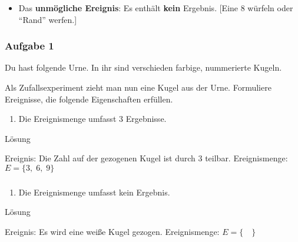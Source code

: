 \documentclass[
  ngerman,
]{book}
\providecommand{\tightlist}{%
  \setlength{\itemsep}{0pt}\setlength{\parskip}{0pt}}
\begin{document}
\begin{itemize}
\tightlist
\item
  Das \textbf{unmögliche Ereignis}: Es enthält \textbf{kein} Ergebnis. {[}Eine 8 würfeln oder ``Rand'' werfen.{]}
\end{itemize}

\hypertarget{section-50}{%
\subsubsection*{}\label{section-50}}

\hypertarget{aufgabe-1-7}{%
\subsubsection*{Aufgabe 1}\label{aufgabe-1-7}}

Du hast folgende Urne. In ihr sind verschieden farbige, nummerierte Kugeln.

Als Zufallsexperiment zieht man nun eine Kugel aus der Urne. Formuliere Ereignisse, die folgende Eigenschaften erfüllen.

\begin{enumerate}
\def\labelenumi{\alph{enumi})}
\tightlist
\item
  Die Ereignismenge umfasst 3 Ergebnisse.
\end{enumerate}

Lösung

Ereignis: Die Zahl auf der gezogenen Kugel ist durch 3 teilbar. Ereignismenge: \(E=\{3,\;6,\;9\}\)

\hypertarget{section-51}{%
\subsubsection*{}\label{section-51}}

\begin{enumerate}
\def\labelenumi{\alph{enumi})}
\setcounter{enumi}{1}
\tightlist
\item
  Die Ereignismenge umfasst kein Ergebnis.
\end{enumerate}

Lösung

Ereignis: Es wird eine weiße Kugel gezogen. Ereignismenge: \(E=\{\quad\}\)

\hypertarget{section-52}{%
\subsubsection*{}\label{section-52}}
\end{document}
